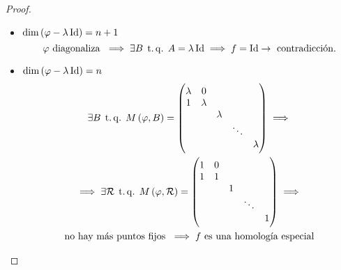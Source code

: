 \begin{proof}
\begin{itemize}
\begin{itemize}
            \item{$\dim \left( \varphi - \lambda \operatorname{Id} \right) = n+1$}
                \[
                    \varphi \text{ diagonaliza } \implies \exists B \operatorname{\;t.q.\;} A=\lambda \operatorname{Id} \implies f= \operatorname{Id} \to \text{ contradicción}.
                \]
            \item{$\dim \left( \varphi - \lambda \operatorname{Id} \right) = n$}
                \begin{gather*}
                    \exists B \operatorname{\;t.q.\;} M \left( \varphi, B \right) =
                    \begin{pmatrix}
                        \lambda & 0 &  &  &  \\
                        1 & \lambda &  &  &  \\
                         &  & \lambda &  &  \\
                         &  &  & \ddots &  \\
                         &  &  &  & \lambda
                    \end{pmatrix} \implies \\
                    \implies \exists \mathcal{R} \operatorname{\;t.q.\;} M \left( \varphi, \mathcal{R} \right) =
                    \begin{pmatrix}
                        1 & 0 &  &  &  \\
                        1 & 1 &  &  &  \\
                         &  & 1 &  &  \\
                         &  &  & \ddots &  \\
                         &  &  &  & 1
                    \end{pmatrix} \implies \\
                    \text{no hay más puntos fijos } \implies f \text{ es una homología especial}
                \end{gather*}
        \end{itemize}
    \end{itemize}
\end{proof}

